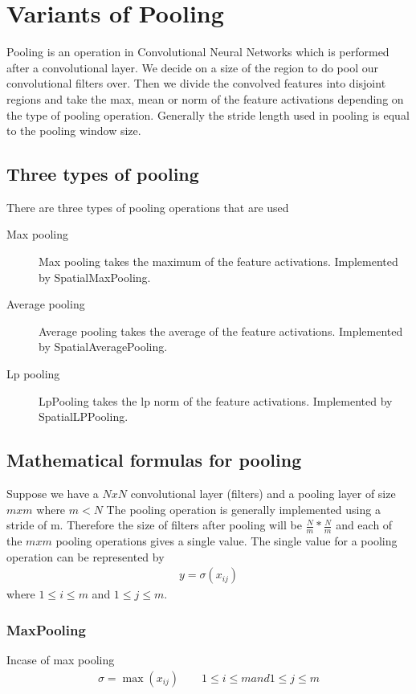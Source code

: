 \documentclass{article}
\begin{document}
\section{Variants of Pooling}
Pooling is an operation in Convolutional Neural Networks which is performed after a convolutional layer.  
We decide on a size of the region to do pool our convolutional filters over.
Then we divide the convolved features into disjoint regions and take the max, mean or norm of the feature activations depending on the type of pooling operation.
Generally the stride length used in pooling is equal to the pooling window size.
\subsection{Three types of pooling}
There are three types of pooling operations that are used
\begin{description}
  \item[Max pooling] Max pooling takes the maximum of the feature activations.  Implemented by \mbox{SpatialMaxPooling}.
  \item[Average pooling] Average pooling takes the average of the feature activations. Implemented by \mbox{SpatialAveragePooling}.
  \item[Lp pooling] LpPooling takes the lp norm of the feature activations. Implemented by \mbox{SpatialLPPooling}.
\end{description}

\subsection{Mathematical formulas for pooling}
Suppose we have a $N x N$ convolutional layer (filters) and a pooling layer of size $m x m$ where $ m < N $
The pooling operation is generally implemented using a stride of m.
Therefore the size of filters after pooling will be $\frac{N}{m} * \frac{N}{m} $ and each of the $m x m$ pooling operations gives a single value.
The single value for a pooling operation can be represented by
\begin{align*}
  y = \sigma(x_{ij})
\end{align*}
where $1 \le i \le m $ and $1 \le j \le m $.
\subsubsection{MaxPooling}
Incase of max pooling
\begin{align*}
  \sigma = \max(x_{ij}) \qquad 1 \le i \le m and 1 \le j \le m
\end{align*}
\end{document}
